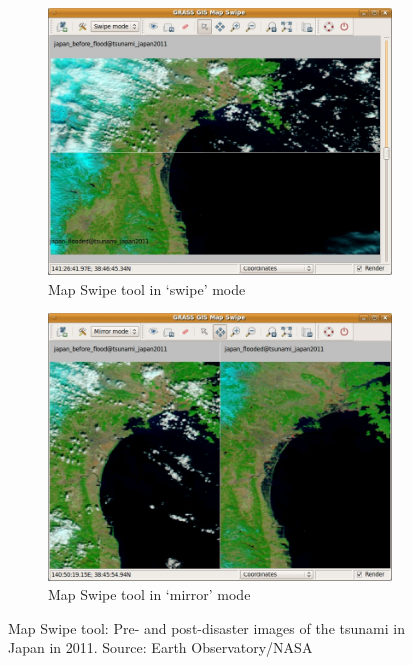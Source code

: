 \documentclass[a4paper,12pt,oneside]{book}
\newcommand{\ms}{Map Swipe\xspace}
\begin{document}
\begin{figure}[ht!]
\centering
    \begin{subfigure}[ht]{0.75\textwidth}
    \centering
        \includegraphics[width=\textwidth]{./images/mapswipe_tsunami_swipe.jpeg}
    \caption{\ms tool in `swipe' mode}
    \label{fig:mapswipe_swipe}
    \end{subfigure}
    \begin{subfigure}[ht]{0.75\textwidth}
    \centering
        \includegraphics[width=\textwidth]{./images/mapswipe_tsunami_mirror.jpeg}
    \caption{\ms tool in `mirror' mode}
    \label{fig:mapswipe_mirror}
    \end{subfigure}
\caption[\ms tool: Pre- and post-disaster images of the tsunami in Japan in 2011]
        {\ms tool: Pre- and post-disaster images of the tsunami in Japan in 2011.
        Source: Earth Observatory/NASA}
\label{fig:mapswipe}
\end{figure}
\end{document}
